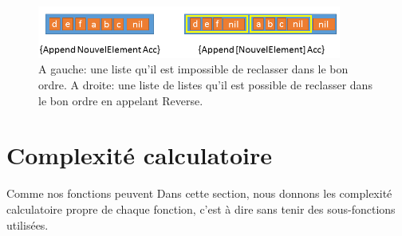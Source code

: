\documentclass[10pt,a4paper]{article}
\begin{document}
\begin{figure}[h!]
\centering
\includegraphics[width=10cm]{images/AstuceAppend.png}
\caption{A gauche: une liste qu'il est impossible de reclasser dans le bon ordre. A droite: une liste de listes qu'il est possible de reclasser dans le bon ordre en appelant Reverse.}
\label{fig:astuceReverse}
\end{figure}





\section{Complexité calculatoire}
Comme nos fonctions peuvent Dans cette section, nous donnons les complexité calculatoire
propre de chaque fonction, c'est à dire sans tenir des sous-fonctions
utilisées.
\end{document}
